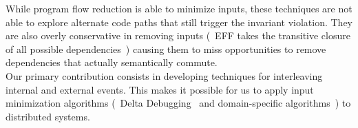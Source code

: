 While program flow reduction is able to minimize inputs,
these techniques are not able to explore alternate code paths that still
trigger the invariant violation. They are also overly conservative in
removing inputs (\eg~EFF takes the transitive closure of all possible
dependencies~\cite{Lee:2011:TGR:1993498.1993528}) causing them to miss opportunities to
remove dependencies that actually semantically commute.\\[0.5ex]
%
 Our primary contribution consists in
developing techniques for interleaving internal and external events. This makes it
possible for us to apply input minimization algorithms (\cf~Delta
Debugging~\cite{Zeller:1999:YMP:318773.318946,Zeller:2002:SIF:506201.506206} and
domain-specific algorithms~\cite{claessen2000quickcheck,whitaker2004configuration,regehr2012test}) to
distributed systems.

